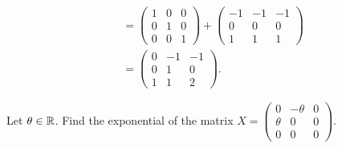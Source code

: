 \documentclass[a4paper]{article}
\begin{document}
\begin{problem}
\begin{enumerate}
\begin{solution}
\begin{align*}
            &= \begin{pmatrix} 1 & 0 & 0 \\ 0 & 1 & 0  \\ 0 & 0 & 1  \end{pmatrix}  + \begin{pmatrix} -1 & -1 & -1 \\ 0 & 0 & 0 \\ 1 & 1 & 1  \end{pmatrix}  \\
            &= \begin{pmatrix} 0 & - 1 & -1 \\ 0 & 1 & 0 \\ 1 & 1 & 2  \end{pmatrix}. 
            \end{align*}
            \end{solution}
    \end{enumerate}
\end{problem}

\begin{problem}
    Let \( \theta \in \mathbb{R}  \). Find the exponential of the matrix \( X = \displaystyle \begin{pmatrix} 0 & - \theta & 0 \\ \theta & 0 & 0 \\ 0 & 0 & 0    \end{pmatrix}.  \)
\end{problem}
\end{document}
